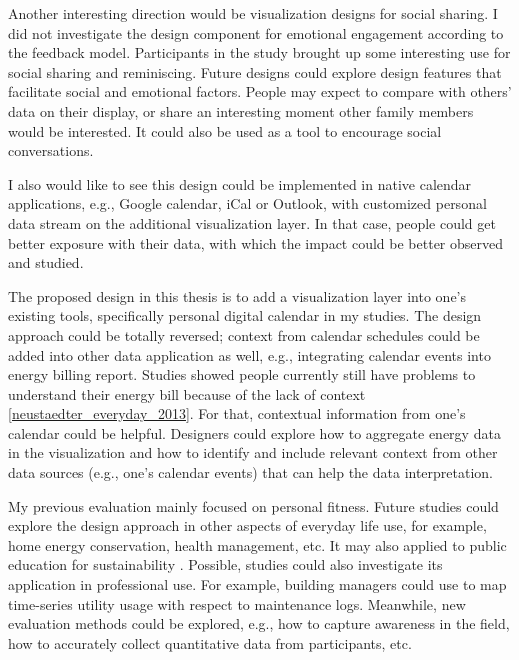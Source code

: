 \documentclass[12pt,oneside]{book}
\begin{document}
Another interesting direction would be  visualization designs for social sharing. I did not investigate the design component for emotional engagement according to the feedback model. Participants in the study brought up some interesting use for social sharing and reminiscing. Future designs could explore design features that facilitate social and emotional factors. People may expect to compare with others' data on their display, or share an interesting moment other family members would be interested. It could also be used as a tool to encourage social conversations.

I also would like to see this design could be implemented in native calendar applications, e.g., Google calendar, iCal or Outlook, with customized personal data stream on the additional visualization layer. In that case, people could get better exposure with their data, with which the impact could be better observed and studied.

The proposed design in this thesis is to add a visualization layer into one's existing tools, specifically personal digital calendar in my studies. The design approach could be totally reversed; context from calendar schedules could be added into other data application as well, e.g., integrating calendar events into energy billing report. Studies showed people currently still have problems to understand their energy bill because of the lack of context \ref{neustaedter_everyday_2013}. For that, contextual information from one's calendar could be helpful. Designers could explore how to aggregate energy data in the visualization and how to identify and include relevant context from other data sources (e.g., one's calendar events) that can help the data interpretation.

My previous evaluation mainly focused on personal fitness. Future studies could explore the design approach in other aspects of everyday life use, for example, home energy conservation, health management, etc. It may also applied to public education for sustainability \cite{sun_aestheic}. Possible, studies could also investigate its application in professional use. For example, building managers could use to map time-series utility usage with respect to maintenance logs. 
Meanwhile, new evaluation methods could be explored, e.g., how to capture awareness in the field, how to accurately collect quantitative data from participants, etc.

\end{document}
